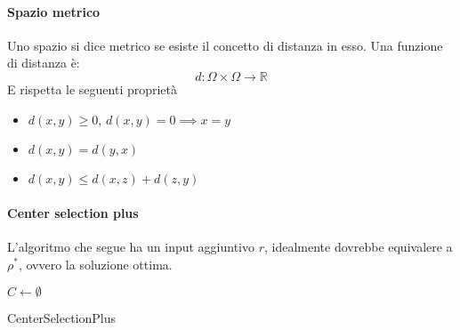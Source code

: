 \paragraph{Spazio metrico}
Uno spazio si dice metrico se esiste il concetto di distanza in esso.
Una funzione di distanza è: 
$$d : \Omega \times \Omega \longrightarrow \mathbb{R} $$
E rispetta le seguenti proprietà
\begin{itemize}
    \item $d(x,y) \geq 0 $, $d(x,y) = 0 \implies x = y$
    \item $d(x,y) = d(y,x)$
    \item $d(x,y) \leq d(x,z) + d(z,y)$
\end{itemize}

\paragraph{Center selection plus}
L'algoritmo che segue ha un input aggiuntivo $r$, idealmente dovrebbe equivalere a 
$\rho^*$, ovvero la soluzione ottima.

\begin{algorithm}[H]
    \SetAlgoLined
    $C \gets \emptyset$\\
     \caption{CenterSelectionPlus}
\end{algorithm}


